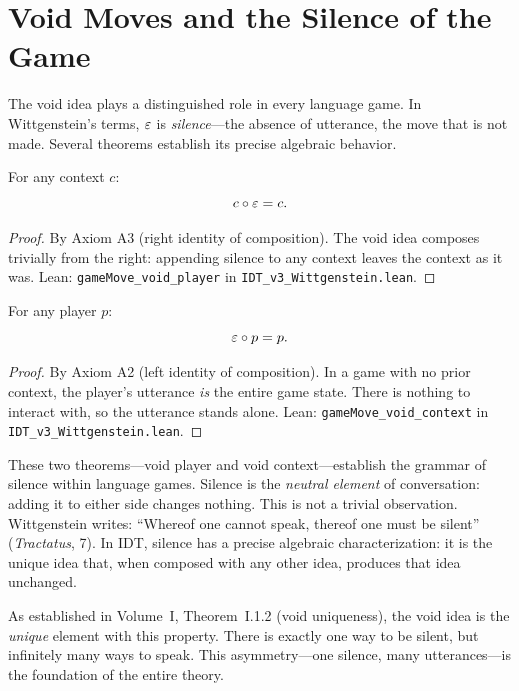 \section{Void Moves and the Silence of the Game}

The void idea plays a distinguished role in every language game. In Wittgenstein's
terms, $\varepsilon$ is \emph{silence}---the absence of utterance, the move that is
not made. Several theorems establish its precise algebraic behavior.

\begin{theorem}
\label{thm:void-player}
For any context $c$:
\[
c \circ \varepsilon = c.
\]
\end{theorem}

\begin{proof}
By Axiom A3 (right identity of composition). The void idea composes trivially
from the right: appending silence to any context leaves the context as it was.
Lean: \texttt{gameMove\_void\_player} in \texttt{IDT\_v3\_Wittgenstein.lean}.
\end{proof}

\begin{theorem}
\label{thm:void-context}
For any player $p$:
\[
\varepsilon \circ p = p.
\]
\end{theorem}

\begin{proof}
By Axiom A2 (left identity of composition). In a game with no prior context,
the player's utterance \emph{is} the entire game state. There is nothing to
interact with, so the utterance stands alone.
Lean: \texttt{gameMove\_void\_context} in \texttt{IDT\_v3\_Wittgenstein.lean}.
\end{proof}

\begin{interpretation}
These two theorems---void player and void context---establish the grammar of
silence within language games. Silence is the \emph{neutral element} of
conversation: adding it to either side changes nothing. This is not a trivial
observation. Wittgenstein writes: ``Whereof one cannot speak, thereof one must
be silent'' (\textit{Tractatus}, 7). In IDT, silence has a precise algebraic
characterization: it is the unique idea that, when composed with any other idea,
produces that idea unchanged.

As established in Volume~I, Theorem~I.1.2 (void uniqueness), the void idea is
the \emph{unique} element with this property. There is exactly one way to be
silent, but infinitely many ways to speak. This asymmetry---one silence, many
utterances---is the foundation of the entire theory.
\end{interpretation}

